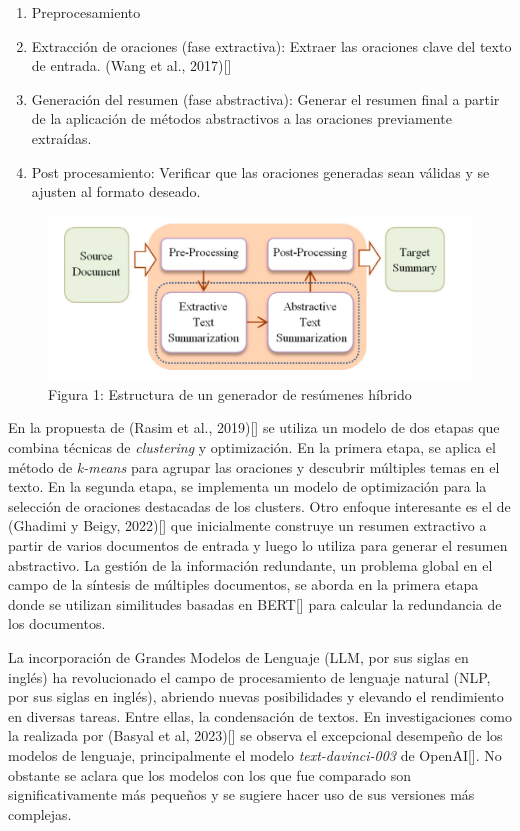 \begin{enumerate}
    \item Preprocesamiento
    \item Extracción de oraciones (fase extractiva): Extraer las oraciones clave del texto de entrada. (Wang et al., 2017)[\cite{Wang}]
    \item Generación del resumen (fase abstractiva): Generar el resumen final a partir de la aplicación de métodos abstractivos a las oraciones previamente extraídas.
    \item Post procesamiento: Verificar que las oraciones generadas sean válidas y se ajusten al formato deseado.
\end{enumerate}

\begin{figure}[H]    
    \centering
    \includegraphics[scale = 1]{Figures/hybrid.png}
    \caption*{Figura 1: Estructura de un generador de resúmenes híbrido}
\end{figure}

En la propuesta de (Rasim et al., 2019)[\cite{cosum}] se utiliza un modelo de dos etapas que combina técnicas de \emph{clustering} y optimización. En la primera etapa, se aplica el método de \emph{k-means} para agrupar las oraciones y descubrir múltiples temas en el texto. En la segunda etapa, se implementa un modelo de optimización para la selección de oraciones destacadas de los clusters. Otro enfoque interesante es el de (Ghadimi y Beigy, 2022)[\cite{hybrid-llm}] que inicialmente construye un resumen extractivo a partir de varios documentos de entrada y luego lo utiliza para generar el resumen abstractivo. La gestión de la información redundante, un problema global en el campo de la síntesis de múltiples documentos, se aborda en la primera etapa donde se utilizan similitudes basadas en BERT[\cite{BERT}] para calcular la redundancia de los documentos.

La incorporación de Grandes Modelos de Lenguaje (LLM, por sus siglas en inglés) ha revolucionado el campo de procesamiento de lenguaje natural (NLP, por sus siglas en inglés), abriendo nuevas posibilidades y elevando el rendimiento en diversas tareas. Entre ellas, la condensación de textos. En investigaciones como la realizada por (Basyal et al, 2023)[\cite{basyal2023text}] se observa el excepcional desempeño de los modelos de lenguaje, principalmente el modelo \emph{text-davinci-003} de OpenAI[\cite{openai}]. No obstante se aclara que los modelos con los que fue comparado son significativamente más peque\~nos y se sugiere hacer uso de sus versiones más complejas.


